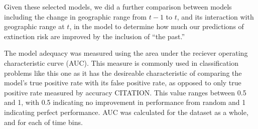 \documentclass[12pt,letterpaper]{article}
\begin{document}
Given these selected models, we did a further comparison between models including the change in geographic range from \(t - 1\) to \(t\), and its interaction with geographic range at \(t\), in the model to determine how much our predictions of extinction risk are improved by the inclusion of ``the past.''

The model adequacy was measured using the area under the reciever operating characteristic curve (AUC). This measure is commonly used in classification problems like this one as it has the desireable characteristic of comparing the model's true positive rate with its false positive rate, as opposed to only true positive rate measured by accuracy CITATION. This value ranges between 0.5 and 1, with 0.5 indicating no improvement in performance from random and 1 indicating perfect performance. AUC was calculated for the dataset as a whole, and for each of time bins.
\end{document}
